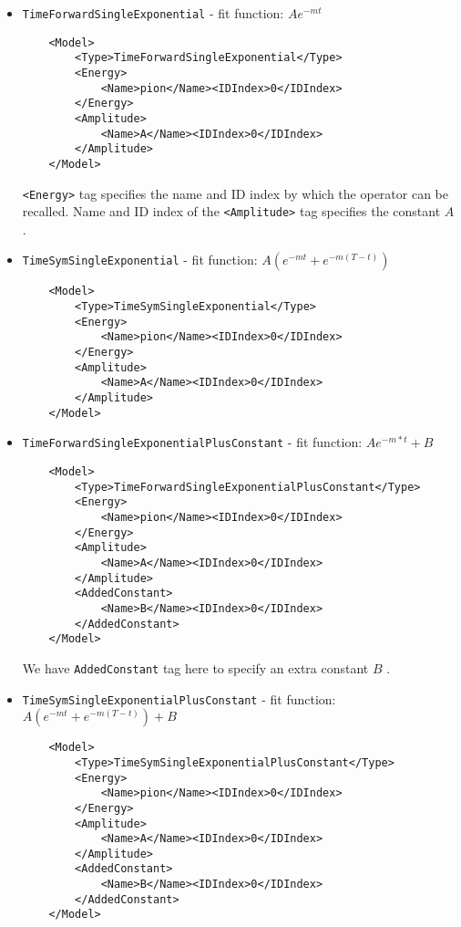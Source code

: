 \documentclass[12pt,notitlepage,letterpaper]{article}
\newcommand{\vb}{\texttt}
\begin{document}
\begin{itemize}
\item \vb{TimeForwardSingleExponential} - fit function: $A e^{-mt}$
\begin{verbatim}
    <Model>
        <Type>TimeForwardSingleExponential</Type>
        <Energy>
            <Name>pion</Name><IDIndex>0</IDIndex>
        </Energy>
        <Amplitude>
            <Name>A</Name><IDIndex>0</IDIndex>
        </Amplitude>
    </Model>
\end{verbatim} 
\vb{<Energy>} tag specifies the name and ID index by which the operator can be recalled.
Name and ID index of the \vb{<Amplitude>} tag specifies the constant $A$ .

\item \vb{TimeSymSingleExponential} - fit function: $A(e^{-mt} + e^{-m(T-t)})$
\begin{verbatim}
    <Model>
        <Type>TimeSymSingleExponential</Type>
        <Energy>
            <Name>pion</Name><IDIndex>0</IDIndex>
        </Energy>
        <Amplitude>
            <Name>A</Name><IDIndex>0</IDIndex>
        </Amplitude>
    </Model>
\end{verbatim}

\item \vb{TimeForwardSingleExponentialPlusConstant} - fit function: $A e^{-m*t} + B$
\begin{verbatim}
    <Model>
        <Type>TimeForwardSingleExponentialPlusConstant</Type>
        <Energy>
            <Name>pion</Name><IDIndex>0</IDIndex>
        </Energy>
        <Amplitude>
            <Name>A</Name><IDIndex>0</IDIndex>
        </Amplitude>
        <AddedConstant>
            <Name>B</Name><IDIndex>0</IDIndex>
        </AddedConstant>
    </Model>
\end{verbatim}

We have \vb{AddedConstant} tag here to specify an extra constant $B$ .

\item \vb{TimeSymSingleExponentialPlusConstant} - fit function: $A(e^{-mt} + e^{-m(T-t)} ) + B$
\begin{verbatim}
    <Model>
        <Type>TimeSymSingleExponentialPlusConstant</Type>
        <Energy>
            <Name>pion</Name><IDIndex>0</IDIndex>
        </Energy>
        <Amplitude>
            <Name>A</Name><IDIndex>0</IDIndex>
        </Amplitude>
        <AddedConstant>
            <Name>B</Name><IDIndex>0</IDIndex>
        </AddedConstant>
    </Model>
\end{verbatim}


\end{itemize}
\end{document}
